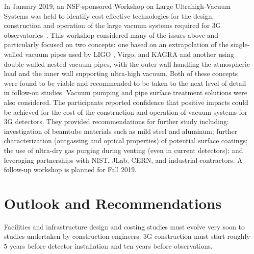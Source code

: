 In January 2019, an NSF-sponsored Workshop on Large Ultrahigh-Vacuum Systems was held to identify cost effective technologies for the design, construction and operation of the large vacuum systems required for \ac{3G} observatories~\cite{LLOVacWorkshop2019}. This workshop considered many of the issues above and particularly focused on two concepts: one based on an extrapolation of the single-walled vacuum pipes used by \ac{LIGO} , Virgo, and \ac{KAGRA}  and another using double-walled nested vacuum pipes, with the outer wall handling the atmospheric load and the inner wall supporting ultra-high vacuum. Both of these concepts were found to be viable and recommended to be taken to the next level of detail in follow-on studies. Vacuum pumping and pipe surface treatment solutions were also considered. The participants reported confidence that positive impacts could be achieved for the cost of the construction and operation of vacuum systems for \ac{3G} detectors. They provided recommendations for further study including: investigation of beamtube materials such as mild steel and aluminum; further characterization (outgassing and optical properties) of potential surface coatings; the use of ultra-dry gas purging during venting (even in current detectors); and leveraging partnerships with \ac{NIST}, \ac{JLab}, \ac{CERN}, and industrial contractors. A follow-up workshop is planned for Fall 2019.

\section{Outlook and Recommendations}
Facilities and infrastructure design and costing studies must evolve very soon to studies undertaken by construction engineers. 
\ac{3G} construction must start roughly 5 years before detector installation and ten years before observations. 


